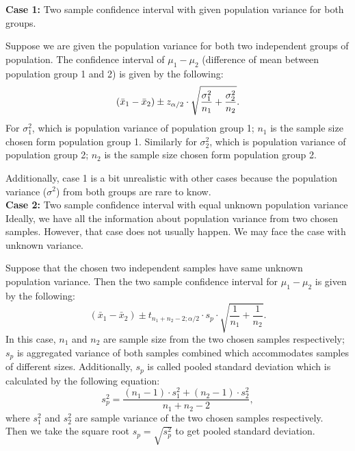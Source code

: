 \textbf{Case 1:} Two sample confidence interval with given population variance for both groups.\\

\begin{definition}
Suppose we are given the population variance for both two independent groups of population. The confidence interval of $\mu_1 - \mu_2$ (difference of mean between population group 1 and 2) is given by the following: \[ (\bar{x}_{1} - \bar{x}_{2})  \pm z_{\small\alpha/2} \cdot \sqrt{ \frac{\sigma_1^2}{n_1} + \frac{\sigma_2^2}{n_2}}.\]
For $\sigma_1^2$, which is population variance of population group 1; $n_1$ is the sample size chosen form population group 1. Similarly for $\sigma_2^2$, which is population variance of population group 2; $n_2$ is the sample size chosen form population group 2.
\end{definition}

Additionally, case 1 is a bit unrealistic with other cases because the population variance ($\sigma^2$) from both groups are rare to know.\\

\textbf{Case 2:} Two sample confidence interval with equal unknown population variance\\

Ideally, we have all the information about population variance from two chosen samples. However, that case does not usually happen. We may face the case with unknown variance.

\begin{definition}
Suppose that the chosen two independent samples have same unknown population variance. Then the two sample confidence interval for $\mu_1 - \mu_2$ is given by the following: $$(\bar{x}_1 - \bar{x}_2)  \pm  t_{n_1+n_2-2; \alpha/2} \cdot s_p \cdot \sqrt{\frac{1}{n_1} + \frac{1}{n_2}}.$$
In this case, $n_1$ and $n_2$ are sample size from the two chosen samples respectively; $s_p$ is aggregated variance of both samples combined which accommodates samples of different sizes.
Additionally, $s_p$ is called pooled standard deviation which is calculated by the following equation: $$s_p^2 = \frac{(n_1-1) \cdot s_1^2 + (n_2-1) \cdot s_2^2 }{n_1+n_2-2},$$
where $s_1^2$ and $s_2^2$ are sample variance of the two chosen samples respectively.\\
Then we take the square root $s_p = \sqrt{s_p^2}$ to get pooled standard deviation.
\end{definition}

